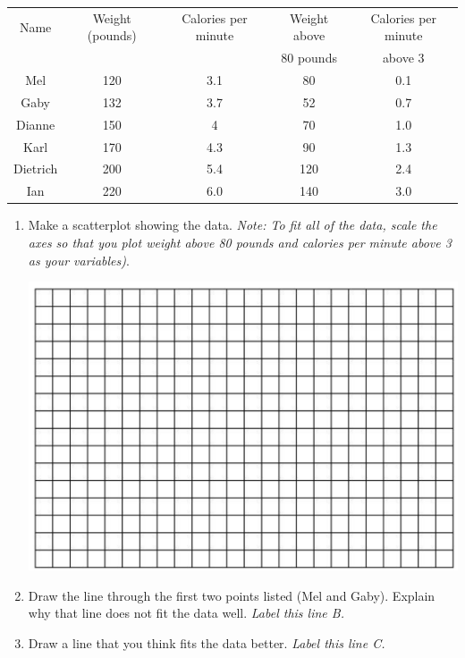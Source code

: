 \documentclass[12pt]{article}
\begin{document}
\begin{enumerate}
\begin{center}
\begin{tabular} { | c | c | c | c | c |} \hline
Name & Weight  (pounds) & Calories per minute & Weight above  & Calories per minute  \\ 
& & &80 pounds  & above 3 \\\hline \hline
Mel & 120 & 3.1  & 80 & 0.1 \\ \hline
Gaby & 132 & 3.7  & 52 & 0.7 \\ \hline
Dianne & 150 & 4 & 70 & 1.0 \\ \hline
Karl & 170 & 4.3 & 90 & 1.3 \\  \hline
Dietrich & 200 & 5.4 & 120 & 2.4 \\ \hline
Ian & 220 & 6.0 & 140 & 3.0 \\ \hline
\end{tabular}
\end{center}

\begin{enumerate}
\item Make a scatterplot showing the data.  \emph{Note: To fit all of the data, scale the axes so that you plot weight above 80 pounds and calories per minute above 3 as your variables)}.
\vfill
\begin{center}
 {\includegraphics [width = 6in] {../graphPaper}}
\end{center}
\vfill

\item  Draw the line through the first two points listed (Mel and Gaby).  Explain why that line does not fit the data well.  \emph{Label this line B.}
\vfill
\vfill
\vfill
\item  Draw a line that you think fits the data better.  \emph{Label this line C.}
\end{enumerate}



\end{enumerate}
\end{document}
